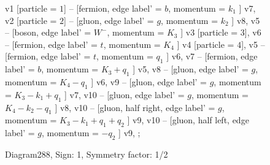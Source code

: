 \documentclass{revtex4}
\begin{document}
\begin{figure}[!htb]
\begin{center}
{    %
v1 [particle = \(1\)] -- [fermion, edge label' = \(b\), momentum = \(k_{1}\) ] v7, 
v2 [particle = \(2\)] -- [gluon, edge label' = \(g\), momentum = \(k_{2}\) ] v8, 
v5 -- [boson, edge label' = \(W^{-}\), momentum = \(K_{3}\) ] v3 [particle = \(3\)], 
v6 -- [fermion, edge label' = \(t\), momentum = \(K_{4}\) ] v4 [particle = \(4\)], 
v5 -- [fermion, edge label' = \(t\), momentum = \(q_{1}\) ] v6, 
v7 -- [fermion, edge label' = \(b\), momentum = \(K_{3} + q_{1}\) ] v5, 
v8 -- [gluon, edge label' = \(g\), momentum = \(K_{4} - q_{1}\) ] v6, 
v9 -- [gluon, edge label' = \(g\), momentum = \(K_{3} - k_{1} + q_{1}\) ] v7, 
v10 -- [gluon, edge label' = \(g\), momentum = \(K_{4} - k_{2} - q_{1}\) ] v8, 
v10 -- [gluon, half right, edge label' = \(g\), momentum = \(K_{3} - k_{1} + q_{1} + q_{2}\) ] v9, 
v10 -- [gluon, half left, edge label' = \(g\), momentum = \(-q_{2}\) ] v9, 
};
\end{center}
\caption{Diagram288, Sign: 1, Symmetry factor: 1/2}
\end{figure}
\newpage
\end{document}
